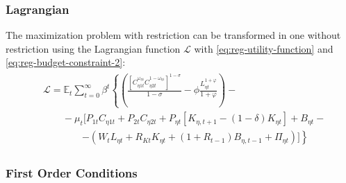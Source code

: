 \documentclass[
thesis.tex
]{subfiles}
\begin{document}
\subsubsection*{Lagrangian}

The maximization problem with restriction can be transformed in one without restriction using the Lagrangian function $\mathcal{L}$ with \ref{eq:reg-utility-function} and \ref{eq:reg-budget-constraint-2}:
\begin{align}
	\begin{split}
	& \mathcal{L} = \mathbb{E}_t \sum_{t=0}^{\infty} \beta^t \left\{ \left( \frac{ \left[ C_{\eta 1 t}^{\omega_{\eta 1}} C_{\eta 2 t}^{1-\omega_{\eta 1}} \right]^{1 -\sigma}}{1 -\sigma} - \phi \frac{L_{\eta t}^{1+\varphi}}{1+\varphi} \right) \right. - \\ & \qquad - \mu_t \Big[ P_{1 t} C_{\eta 1 t} + P_{2 t} C_{\eta 2 t} + P_{\eta t} [ K_{\eta, t+1} - (1-\delta)K_{\eta t} ] + B_{\eta t} - \\ & \qquad \qquad \left. - ( W_t L_{\eta t} + R_{Kt} K_{\eta t} + (1 + R_{t-1}) B_{\eta,t-1} + \Pi_{\eta t} ) \Big] \right\} \label{eq:reg-household-lagrangian}
	\end{split}
\end{align}

\subsubsection*{First Order Conditions}
\end{document}
